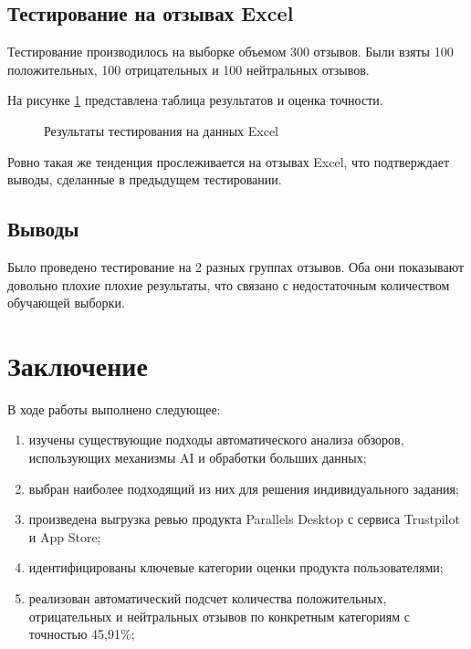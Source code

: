 \documentclass[a4paper,12pt]{article}
\begin{document}
	
	\subsection{Тестирование на отзывах Excel}
	
	Тестирование производилось на выборке объемом 300 отзывов. Были взяты 100 положительных, 100 отрицательных и 100 нейтральных отзывов.
	
	На рисунке \ref{fig:excel} представлена таблица результатов и оценка точности.
	
	\begin{figure}[h!]
		\caption{Результаты тестирования на данных Excel}
		\label{fig:excel}
	\end{figure}

	Ровно такая же тенденция прослеживается на отзывах Excel, что подтверждает выводы, сделанные в предыдущем тестировании.
	
	\subsection*{Выводы}
	
	Было проведено тестирование на 2 разных группах отзывов. Оба они показывают довольно плохие плохие результаты, что связано с недостаточным количеством обучающей выборки.
	
	\newpage
	
	\section*{Заключение}
	
	В ходе работы выполнено следующее:
	
	\begin{enumerate} 
		\item[1)] изучены существующие подходы автоматического анализа обзоров, использующих механизмы AI и обработки больших данных;
		\item[2)] выбран наиболее подходящий из них для решения индивидуального задания;
		\item[3)] произведена выгрузка ревью продукта Parallels Desktop с сервиса Trustpilot и App Store;
		\item[4)] идентифицированы ключевые категории оценки продукта пользователями;
		\item[5)] реализован автоматический подсчет количества положительных, отрицательных и нейтральных отзывов по конкретным категориям с точностью 45,91\%;
	\end{enumerate}
\end{document}
